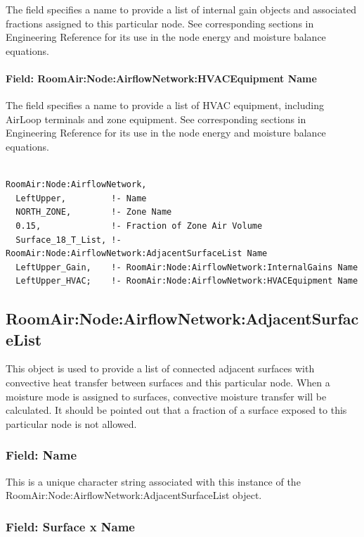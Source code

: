 The field specifies a name to provide a list of internal gain objects and associated fractions assigned to this particular node. See corresponding sections in Engineering Reference for its use in the node energy and moisture balance equations.

\paragraph{Field: RoomAir:Node:AirflowNetwork:HVACEquipment Name}\label{field-roomairnodeairflownetworkhvacequipment-name}

The field specifies a name to provide a list of HVAC equipment, including AirLoop terminals and zone equipment. See corresponding sections in Engineering Reference for its use in the node energy and moisture balance equations.

\begin{lstlisting}

RoomAir:Node:AirflowNetwork,
  LeftUpper,         !- Name
  NORTH_ZONE,        !- Zone Name
  0.15,              !- Fraction of Zone Air Volume
  Surface_18_T_List, !- RoomAir:Node:AirflowNetwork:AdjacentSurfaceList Name
  LeftUpper_Gain,    !- RoomAir:Node:AirflowNetwork:InternalGains Name
  LeftUpper_HVAC;    !- RoomAir:Node:AirflowNetwork:HVACEquipment Name
\end{lstlisting}

\subsection{RoomAir:Node:AirflowNetwork:AdjacentSurfaceList}\label{roomairnodeairflownetworkadjacentsurfacelist}

This object is used to provide a list of connected adjacent surfaces with convective heat transfer between surfaces and this particular node. When a moisture mode is assigned to surfaces, convective moisture transfer will be calculated. It should be pointed out that a fraction of a surface exposed to this particular node is not allowed.

\subsubsection{Field: Name}\label{field-name-9-015}

This is a unique character string associated with this instance of the RoomAir:Node:AirflowNetwork:AdjacentSurfaceList object.

\subsubsection{Field: Surface x Name}\label{field-surface-x-name-000}

